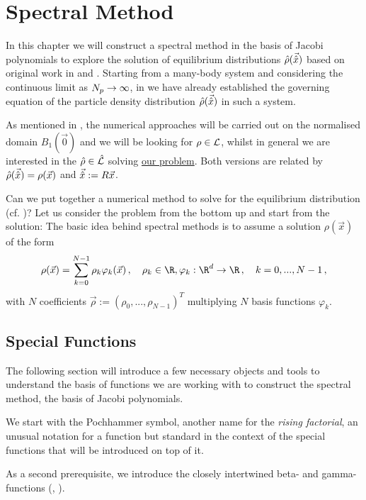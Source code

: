 \chapter{Spectral Method}
\label{chap:spectral-method}
In this chapter we will construct a spectral method in the basis of Jacobi polynomials to explore the solution of equilibrium distributions $\hat{\rho}(\vec{\hat{x}})$ based on original work in \cite{2020-power-law-kernels} and \cite{2021-arbitrary-dimensions}.
Starting from a many-body system and considering the continuous limit as $N_p \rightarrow \infty$, in  we have already established the governing equation of the particle density distribution $\hat{\rho}(\vec{\hat{x}})$ in such a system.

As mentioned in , the numerical approaches will be carried out on the normalised domain $B_1(\vec{0})$ and we will be looking for $\rho \in \mathcal{L}$, whilst in general we are interested in the $\hat{\rho} \in \hat{\mathcal{L}}$ solving \hyperref[def:the-problem]{our problem}.
Both versions are related by $\hat{\rho}(\vec{\hat{x}}) = \rho(\vec{x})$ and $\vec{\hat{x}} := R \vec{x}$.

Can we put together a numerical method to solve for the equilibrium distribution (cf. )?
Let us consider the problem from the bottom up and start from the solution:
The basic idea behind spectral methods is to assume a solution $\rho(\vec{x})$ of the form
$$\rho(\vec{x}) = \sum_{k=0}^{N-1} \rho_k \varphi_k(\vec{x})\,,\quad \rho_k \in \R, \varphi_k: \R^d \to \R\,,\quad k = 0, ..., N-1\,,$$
with $N$ coefficients $\vec{\rho} := \left(\rho_0, ..., \rho_{N-1}\right)^T$ multiplying $N$ basis functions $\varphi_k$.

\section{Special Functions}
The following section will introduce a few necessary objects and tools to understand the basis of functions we are working with to construct the spectral method, the basis of Jacobi polynomials.

We start with the Pochhammer symbol, another name for the \textit{rising factorial}, an unusual notation for a function but standard in the context of the special functions that will be introduced on top of it.


As a second prerequisite, we introduce the closely intertwined beta- and gamma-functions (, ).



